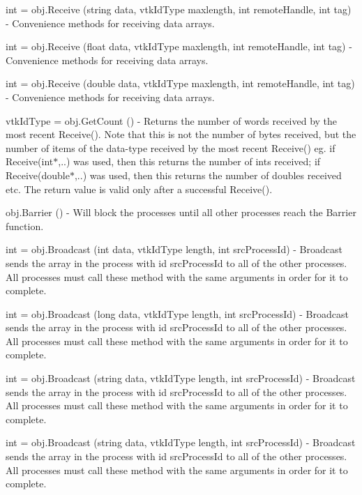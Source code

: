 \begin{DoxyItemize}
\item {\ttfamily int = obj.\-Receive (string data, vtk\-Id\-Type maxlength, int remote\-Handle, int tag)} -\/ Convenience methods for receiving data arrays.  
\item {\ttfamily int = obj.\-Receive (float data, vtk\-Id\-Type maxlength, int remote\-Handle, int tag)} -\/ Convenience methods for receiving data arrays.  
\item {\ttfamily int = obj.\-Receive (double data, vtk\-Id\-Type maxlength, int remote\-Handle, int tag)} -\/ Convenience methods for receiving data arrays.  
\item {\ttfamily vtk\-Id\-Type = obj.\-Get\-Count ()} -\/ Returns the number of words received by the most recent Receive(). Note that this is not the number of bytes received, but the number of items of the data-\/type received by the most recent Receive() eg. if Receive(int$\ast$,..) was used, then this returns the number of ints received; if Receive(double$\ast$,..) was used, then this returns the number of doubles received etc. The return value is valid only after a successful Receive().  
\item {\ttfamily obj.\-Barrier ()} -\/ Will block the processes until all other processes reach the Barrier function.  
\item {\ttfamily int = obj.\-Broadcast (int data, vtk\-Id\-Type length, int src\-Process\-Id)} -\/ Broadcast sends the array in the process with id {\ttfamily src\-Process\-Id} to all of the other processes. All processes must call these method with the same arguments in order for it to complete.  
\item {\ttfamily int = obj.\-Broadcast (long data, vtk\-Id\-Type length, int src\-Process\-Id)} -\/ Broadcast sends the array in the process with id {\ttfamily src\-Process\-Id} to all of the other processes. All processes must call these method with the same arguments in order for it to complete.  
\item {\ttfamily int = obj.\-Broadcast (string data, vtk\-Id\-Type length, int src\-Process\-Id)} -\/ Broadcast sends the array in the process with id {\ttfamily src\-Process\-Id} to all of the other processes. All processes must call these method with the same arguments in order for it to complete.  
\item {\ttfamily int = obj.\-Broadcast (string data, vtk\-Id\-Type length, int src\-Process\-Id)} -\/ Broadcast sends the array in the process with id {\ttfamily src\-Process\-Id} to all of the other processes. All processes must call these method with the same arguments in order for it to complete.  

\end{DoxyItemize}
